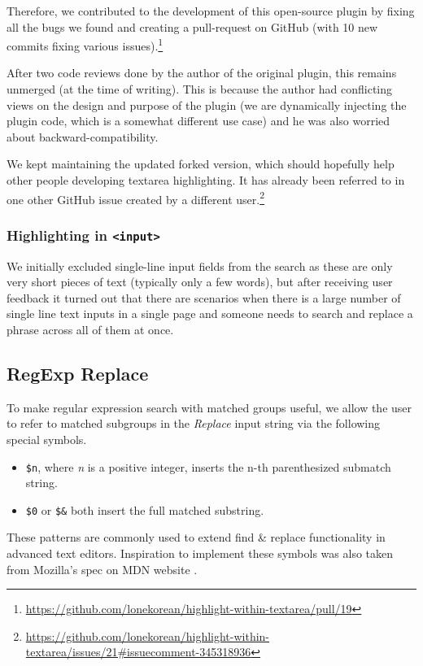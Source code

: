 \documentclass[bsc,frontabs,twoside,singlespacing,parskip,deptreport]{infthesis}
\providecommand{\tightlist}{%
  \setlength{\itemsep}{0pt}\setlength{\parskip}{0pt}}
\begin{document}
Therefore, we contributed to the development of this open-source plugin by fixing all the bugs we found and creating a pull-request on GitHub (with 10 new commits fixing various issues).\footnote{\url{https://github.com/lonekorean/highlight-within-textarea/pull/19}}

After two code reviews done by the author of the original plugin, this remains unmerged (at the time of writing). This is because the author had conflicting views on the design and purpose of the plugin (we are dynamically injecting the plugin code, which is a somewhat different use case) and he was also worried about backward-compatibility. 

We kept maintaining the updated forked version, which should hopefully help other people developing textarea highlighting. It has already been referred to in one other GitHub issue created by a different user.\footnote{\url{https://github.com/lonekorean/highlight-within-textarea/issues/21\#issuecomment-345318936}}

\subsubsection{Highlighting in \texttt{\textless{}input\textgreater{}}}
We initially excluded single-line input fields from the search as these are only very short pieces of text (typically only a few words), but after receiving user feedback it turned out that there are scenarios when there is a large number of single line text inputs in a single page and someone needs to search and replace a phrase across all of them at once.


\subsection{RegExp Replace}
To make regular expression search with matched groups useful, we allow the user to refer to matched subgroups in the \textit{Replace} input string via the following special symbols.

\begin{itemize}
\tightlist
\item
  \texttt{\$n}, where \textit{n} is a positive integer, inserts the n-th parenthesized submatch string.
\item
  \texttt{\$0} or \texttt{\$\&} both insert the full matched substring.
\end{itemize}

These patterns are commonly used to extend find \& replace functionality in advanced text editors. Inspiration to implement these symbols was also taken from Mozilla's spec on MDN website \cite{M9}.
\end{document}

